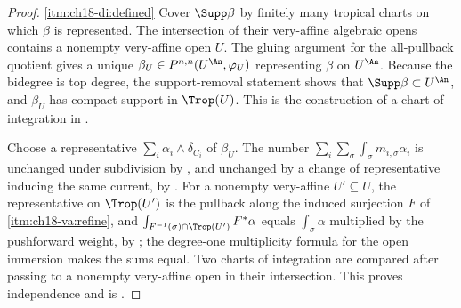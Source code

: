 \begin{proof}
\cref{itm:ch18-di:defined} Cover $\Supp\beta$ by finitely many tropical
charts on which $\beta$ is represented.  The intersection of their
very-affine algebraic opens contains a nonempty very-affine open $U$.
The gluing argument for the all-pullback quotient gives a unique
$\beta_U\in P^{n,n}(U^{\An},\varphi_U)$ representing $\beta$ on $U^{\An}$.
Because the bidegree is top degree, the support-removal statement
\cite[Corollary~5.6]{GK17} shows that $\Supp\beta\subset U^{\An}$,
and $\beta_U$ has compact support in $\Trop(U)$.  This is the construction
of a chart of integration in \cite[Proposition~5.7 and
Definition~5.8]{GK17}.

Choose a representative $\sum_i\alpha_i\wedge\delta_{C_i}$ of $\beta_U$.
The number
$\sum_i\sum_\sigma\int_\sigma m_{i,\sigma}\alpha_i$ is unchanged under
subdivision by , and unchanged by a
change of representative inducing the same current, by
.  For a nonempty very-affine
$U'\subseteq U$, the representative on $\Trop(U')$ is the pullback along
the induced surjection $F$ of
\,\cref{itm:ch18-va:refine}, and
$\int_{F^{-1}(\sigma)\cap\Trop(U')}F^*\alpha$ equals
$\int_\sigma\alpha$ multiplied by the pushforward weight, by
; the degree-one multiplicity formula for
the open immersion makes the sums equal.  Two charts of integration are
compared after passing to a nonempty very-affine open in their intersection.
This proves independence and is \cite[Proposition~5.9]{GK17}.


\end{proof}
